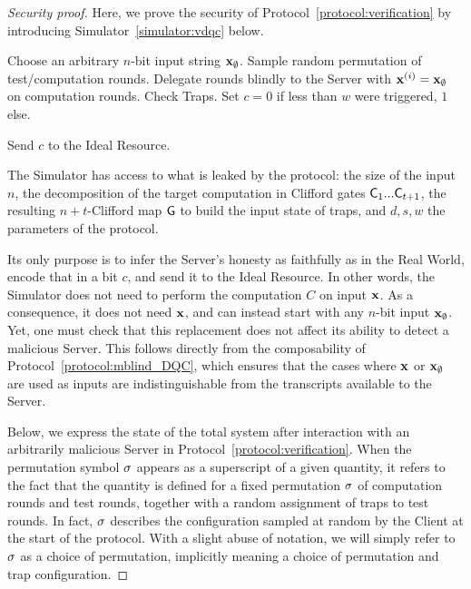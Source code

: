 \begin{proof}[Security proof]
    Here, we prove the security of Protocol~\ref{protocol:verification} by introducing Simulator~\ref{simulator:vdqc} below.
\begin{simulatorr}
    \caption{Verified Delegated Quantum Computation}
    \label{simulator:vdqc}
    \begin{algorithmic}[0]

    \State Choose an arbitrary $n$-bit input string $\mathbf x_\emptyset$.
    \State Sample random permutation of test/computation rounds.
    \State Delegate rounds blindly to the Server with $\mathbf x^{(i)}=\mathbf x_\emptyset$ on computation rounds.
    \State Check Traps. Set $c=0$ if less than $w$ were triggered, $1$ else.
    \EndProcedure

    \State Send $c$ to the Ideal Resource.
    \EndProcedure
    \end{algorithmic}
\end{simulatorr}     The Simulator has access to what is leaked by the protocol: the size of the input $n$, the decomposition of the target computation in Clifford gates $\mathsf{C}_1...\mathsf{C}_{t+1}$, the resulting $n+t$-Clifford map $\mathsf{G}$ to build the input state of traps, and $d, s, w$ the parameters of the protocol.

Its only purpose is to infer the Server's honesty as faithfully as in the Real World, encode that in a bit $c$, and send it to the Ideal Resource. In other words, the Simulator does not need to perform the computation $C$ on input $\mathbf x$. As a consequence, it does not need $\mathbf x$, and can instead start with any $n$-bit input $\mathbf x_\emptyset$. Yet, one must check that this replacement does not affect its ability to detect a malicious Server. This follows directly from the composability of Protocol~\ref{protocol:mblind_DQC}, which ensures that the cases where $\mathbf x$ or $\mathbf x_\emptyset$ are used as inputs are indistinguishable from the transcripts available to the Server.

    Below, we express the state of the total system after interaction with an arbitrarily malicious Server in Protocol~\ref{protocol:verification}. When the permutation symbol $\sigma$ appears as a superscript of a given quantity, it refers to the fact that the quantity is defined for a fixed permutation $\sigma$ of computation rounds and test rounds, together with a random assignment of traps to test rounds. In fact, $\sigma$ describes the configuration sampled at random by the Client at the start of the protocol. With a slight abuse of notation, we will simply refer to $\sigma$ as a choice of permutation, implicitly meaning a choice of permutation and trap configuration.


\end{proof}
